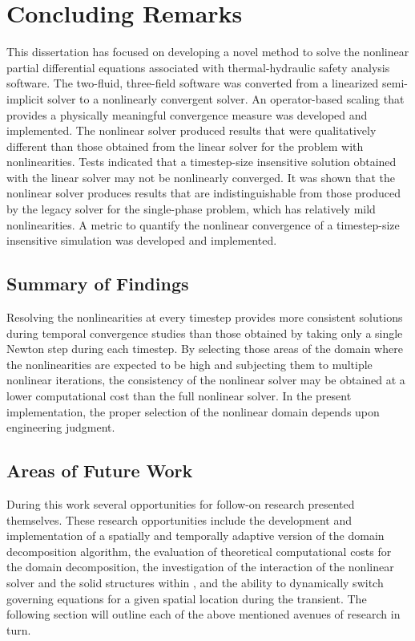 \chapter{Concluding Remarks}
\label{chap:end}
This dissertation has focused on developing a novel method to solve the nonlinear partial differential equations associated with thermal-hydraulic safety analysis software.
The two-fluid, three-field software \cobra{} was converted from a linearized semi-implicit solver to a nonlinearly convergent solver.
An operator-based scaling that provides a physically meaningful convergence measure was developed and implemented.
The nonlinear solver produced results that were qualitatively different than those obtained from the linear solver for the problem with nonlinearities.
Tests indicated that a timestep-size insensitive solution obtained with the linear solver may not be nonlinearly converged.
It was shown that the nonlinear solver produces results that are indistinguishable from those produced by the legacy solver for the single-phase problem, which has relatively mild nonlinearities.
A metric to quantify the nonlinear convergence of a timestep-size insensitive simulation was developed and implemented.

\section{Summary of Findings}
\label{sect:end:summary}
Resolving the nonlinearities at every timestep provides more consistent solutions during temporal convergence studies than those obtained by taking only a single Newton step during each timestep.
By selecting those areas of the domain where the nonlinearities are expected to be high and subjecting them to multiple nonlinear iterations, the consistency of the nonlinear solver may be obtained at a lower computational cost than the full nonlinear solver.
In the present implementation, the proper selection of the nonlinear domain depends upon engineering judgment.

\section{Areas of Future Work}
\label{sect:futureWork}
During this work several opportunities for follow-on research presented themselves.
These research opportunities include the development and implementation of a spatially and temporally adaptive version of the domain decomposition algorithm, the evaluation of theoretical computational costs for the domain decomposition, the investigation of the interaction of the nonlinear solver and the solid structures within \cobra{}, and the ability to dynamically switch governing equations for a given spatial location during the transient.
The following section will outline each of the above mentioned avenues of research in turn.

